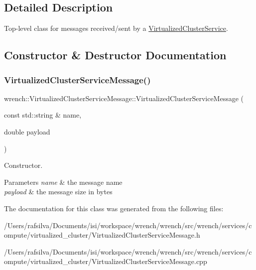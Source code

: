 \subsection{Detailed Description}
Top-\/level class for messages received/sent by a \hyperlink{classwrench_1_1_virtualized_cluster_service}{Virtualized\+Cluster\+Service}. 

\subsection{Constructor \& Destructor Documentation}
\mbox{\label{classwrench_1_1_virtualized_cluster_service_message_a124699b0def3ecd4bd91f9ea90991471}} 
\subsubsection{\texorpdfstring{Virtualized\+Cluster\+Service\+Message()}{VirtualizedClusterServiceMessage()}}
{\footnotesize\ttfamily wrench\+::\+Virtualized\+Cluster\+Service\+Message\+::\+Virtualized\+Cluster\+Service\+Message (\begin{DoxyParamCaption}\item[{const std\+::string \&}]{name,  }\item[{double}]{payload }\end{DoxyParamCaption})\hspace{0.3cm}{\ttfamily [protected]}}



Constructor. 


\begin{DoxyParams}{Parameters}
{\em name} & the message name \\
\hline
{\em payload} & the message size in bytes \\
\hline
\end{DoxyParams}


The documentation for this class was generated from the following files\+:\begin{DoxyCompactItemize}
\item 
/\+Users/rafsilva/\+Documents/isi/workspace/wrench/wrench/src/wrench/services/compute/virtualized\+\_\+cluster/Virtualized\+Cluster\+Service\+Message.\+h\item 
/\+Users/rafsilva/\+Documents/isi/workspace/wrench/wrench/src/wrench/services/compute/virtualized\+\_\+cluster/Virtualized\+Cluster\+Service\+Message.\+cpp\end{DoxyCompactItemize}
